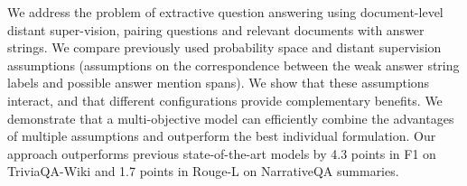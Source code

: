 We address the problem of extractive question answering using document-level distant super-vision,  pairing questions and relevant documents with answer strings. We compare previously used probability space and distant supervision assumptions (assumptions on the correspondence between the weak answer string labels and possible answer mention spans). We show that these assumptions interact, and that different configurations provide complementary benefits. We demonstrate that a multi-objective model can efficiently combine the advantages of multiple assumptions and outperform the best individual formulation. Our approach outperforms previous state-of-the-art models by 4.3 points in F1 on TriviaQA-Wiki and 1.7 points in Rouge-L on NarrativeQA summaries.
